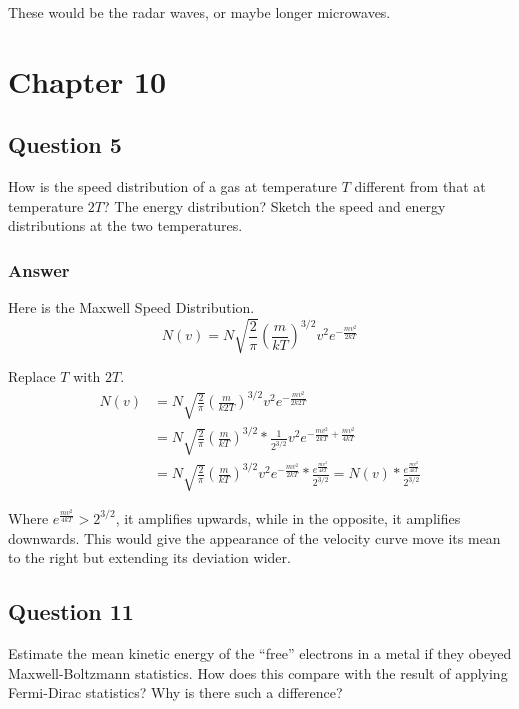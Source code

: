 \documentclass[12pt]{article}
\newcommand{\e}[1]{e^{#1}}
\begin{document}
            These would be the radar waves, or maybe longer microwaves.
        
\pagebreak
\section{Chapter 10}
    \subsection{Question 5}
        How is the speed distribution of a gas at temperature $T$ different from that at temperature $2T$? 
        The energy distribution? 
        Sketch the speed and energy distributions at the two temperatures.

        \subsubsection{Answer}
            Here is the Maxwell Speed Distribution.
            \begin{equation}
                N(v) = N \sqrt{\frac{2}{\pi}} \left( \frac{m}{kT} \right)^{3/2} v^2 \e{-\frac{mv^2}{2kT}}
            \end{equation}

            Replace $T$ with $2T$.
            \begin{align}
                N(v)    &=  N \sqrt{\frac{2}{\pi}} \left( \frac{m}{k2T} \right)^{3/2} v^2 \e{-\frac{mv^2}{2k2T}}\\
                    &=  N \sqrt{\frac{2}{\pi}} \left( \frac{m}{kT} \right)^{3/2} * \frac{1}{2^{3/2}} v^2 \e{-\frac{mv^2}{2kT} + \frac{mv^2}{4kT}}\\
                    &=  N \sqrt{\frac{2}{\pi}} \left( \frac{m}{kT} \right)^{3/2} v^2 \e{-\frac{mv^2}{2kT}} * \frac{\e{\frac{mv^2}{4kT}}}{2^{3/2}}
                    =   N(v) * \frac{\e{\frac{mv^2}{4kT}}}{2^{3/2}}
            \end{align}

            Where $\e{\frac{mv^2}{4kT}} > 2^{3/2}$, it amplifies upwards, while in the opposite, it amplifies downwards.
            This would give the appearance of the velocity curve move its mean to the right but extending its deviation wider.
    
    \pagebreak
    \subsection{Question 11}
        Estimate the mean kinetic energy of the ``free'' electrons in a metal if they obeyed Maxwell-Boltzmann statistics. 
        How does this compare with the result of applying Fermi-Dirac statistics? 
        Why is there such a difference?
\end{document}
